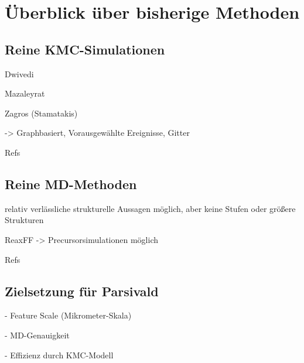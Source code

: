 \section{Überblick über bisherige Methoden}

\subsection{Reine KMC-Simulationen}

Dwivedi

Mazaleyrat

Zagros (Stamatakis)

-> Graphbasiert, Vorausgewählte Ereignisse, Gitter

Refs


\subsection{Reine MD-Methoden}

relativ verlässliche strukturelle Aussagen möglich, aber keine Stufen oder größere Strukturen

ReaxFF -> Precursorsimulationen möglich

Refs


\subsection{Zielsetzung für Parsivald}

- Feature Scale (Mikrometer-Skala)

- MD-Genauigkeit

- Effizienz durch KMC-Modell
